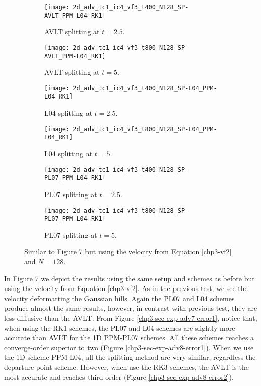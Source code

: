 \begin{figure}[!htb]
	\centering
	\begin{subfigure}{0.4\textwidth}
		\centering
		\texttt{[image: 2d\_adv\_tc1\_ic4\_vf3\_t400\_N128\_SP-AVLT\_PPM-L04\_RK1]}
		\caption{AVLT splitting at $t=2.5$.\label{chp3-sec-exp-adv4-a}}
	\end{subfigure}
	\begin{subfigure}{0.4\textwidth}
		\centering
		\texttt{[image: 2d\_adv\_tc1\_ic4\_vf3\_t800\_N128\_SP-AVLT\_PPM-L04\_RK1]}
		\caption{AVLT splitting at $t=5$.\label{chp3-sec-exp-adv4-b}}
	\end{subfigure}
	
	\begin{subfigure}{0.4\textwidth}
		\centering
		\texttt{[image: 2d\_adv\_tc1\_ic4\_vf3\_t400\_N128\_SP-L04\_PPM-L04\_RK1]}
		\caption{L04 splitting at $t=2.5$.\label{chp3-sec-exp-adv4-c}}
	\end{subfigure}
	\begin{subfigure}{0.4\textwidth}
		\centering
		\texttt{[image: 2d\_adv\_tc1\_ic4\_vf3\_t800\_N128\_SP-L04\_PPM-L04\_RK1]}
		\caption{L04 splitting at $t=5$.\label{chp3-sec-exp-adv4-d}}
	\end{subfigure} 
	
	\begin{subfigure}{0.4\textwidth}
		\centering
		\texttt{[image: 2d\_adv\_tc1\_ic4\_vf3\_t400\_N128\_SP-PL07\_PPM-L04\_RK1]}
		\caption{PL07 splitting at $t=2.5$.\label{chp3-sec-exp-adv4-e}}
	\end{subfigure}
	\begin{subfigure}{0.4\textwidth}
		\centering
		\texttt{[image: 2d\_adv\_tc1\_ic4\_vf3\_t800\_N128\_SP-PL07\_PPM-L04\_RK1]}
		\caption{PL07 splitting at $t=5$.\label{chp3-sec-exp-adv4-f}}
	\end{subfigure} 
	
	\caption{Similar to Figure \ref{chp3-sec-exp-adv4} but using the velocity from Equation \eqref{chp3-vf2} and $N=128$.
		\label{chp3-sec-exp-adv4}}
\end{figure}

In Figure \ref{chp3-sec-exp-adv4} we depict the results using the same setup and schemes as before but using the velocity from
Equation \eqref{chp3-vf2}. 
As in the previous test, we see the velocity deformarting the Gaussian hills.
Again the PL07 and L04 schemes produce almost the same results, however, in contrast with previous test, 
they are less diffusive than the AVLT.
From Figure \ref{chp3-sec-exp-adv7-error1},  notice that, when using the RK1 schemes, 
the PL07 and L04 schemes are slightly more accurate than AVLT for the 1D PPM-PL07 schemes.
All these schemes reaches a converge-order superior to two (Figure \ref{chp3-sec-exp-adv8-error1}).
When we use the 1D scheme PPM-L04, all the splitting method are very similar,
regardless the departure point scheme.
However, when use the RK3 schemes, the AVLT is the most accurate and reaches third-order (Figure \ref{chp3-sec-exp-adv8-error2}).

